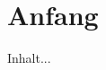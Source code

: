 \documentclass{olltutorial}
\begin{document}
\titleaschapter
\chapter{Anfang}
Inhalt...
\end{document}

